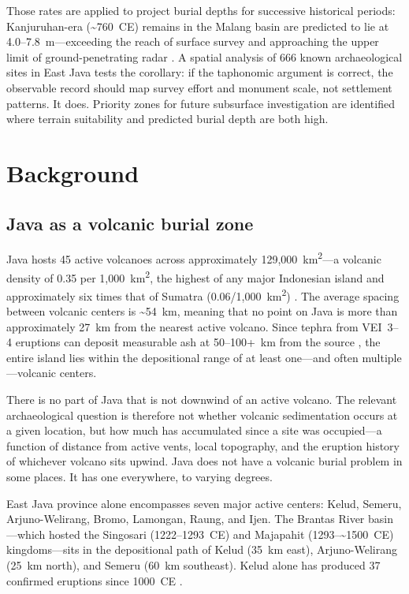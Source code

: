 \documentclass[12pt,a4paper]{article}
\begin{document}
Those rates are applied to project burial depths for successive historical periods: Kanjuruhan-era (\textasciitilde760~CE) remains in the Malang basin are predicted to lie at 4.0--7.8~m---exceeding the reach of surface survey and approaching the upper limit of ground-penetrating radar \citep{putra2019}. A spatial analysis of 666 known archaeological sites in East Java tests the corollary: if the taphonomic argument is correct, the observable record should map survey effort and monument scale, not settlement patterns. It does. Priority zones for future subsurface investigation are identified where terrain suitability and predicted burial depth are both high.

\section{Background}

\subsection{Java as a volcanic burial zone}

Java hosts 45 active volcanoes across approximately 129,000~km\textsuperscript{2}---a volcanic density of 0.35 per 1,000~km\textsuperscript{2}, the highest of any major Indonesian island and approximately six times that of Sumatra (0.06/1,000~km\textsuperscript{2}) \citep{vanbemmelen1949}. The average spacing between volcanic centers is \textasciitilde54~km, meaning that no point on Java is more than approximately 27~km from the nearest active volcano. Since tephra from VEI~3--4 eruptions can deposit measurable ash at 50--100+~km from the source \citep{newhall1982}, the entire island lies within the depositional range of at least one---and often multiple---volcanic centers.

There is no part of Java that is not downwind of an active volcano. The relevant archaeological question is therefore not whether volcanic sedimentation occurs at a given location, but how much has accumulated since a site was occupied---a function of distance from active vents, local topography, and the eruption history of whichever volcano sits upwind. Java does not have a volcanic burial problem in some places. It has one everywhere, to varying degrees.

East Java province alone encompasses seven major active centers: Kelud, Semeru, Arjuno-Welirang, Bromo, Lamongan, Raung, and Ijen. The Brantas River basin---which hosted the Singosari (1222--1293~CE) and Majapahit (1293--\textasciitilde1500~CE) kingdoms---sits in the depositional path of Kelud (35~km east), Arjuno-Welirang (25~km north), and Semeru (60~km southeast). Kelud alone has produced 37 confirmed eruptions since 1000~CE \citep{gvp2024,maeno2019}.
\end{document}
